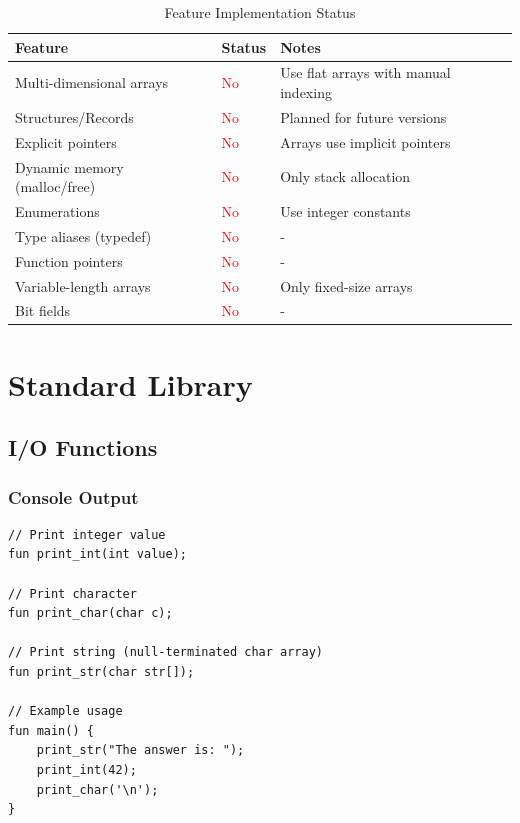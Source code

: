 \documentclass[12pt,a4paper,oneside]{book}
\begin{document}
\begin{table}[H]
\centering
\caption{Feature Implementation Status}
\begin{tabularx}{\textwidth}{|X|l|X|}
\hline
\textbf{Feature} & \textbf{Status} & \textbf{Notes} \\
\hline
Multi-dimensional arrays & \textcolor{red}{No} & Use flat arrays with manual indexing \\
\hline
Structures/Records & \textcolor{red}{No} & Planned for future versions \\
\hline
Explicit pointers & \textcolor{red}{No} & Arrays use implicit pointers \\
\hline
Dynamic memory (malloc/free) & \textcolor{red}{No} & Only stack allocation \\
\hline
Enumerations & \textcolor{red}{No} & Use integer constants \\
\hline
Type aliases (typedef) & \textcolor{red}{No} & - \\
\hline
Function pointers & \textcolor{red}{No} & - \\
\hline
Variable-length arrays & \textcolor{red}{No} & Only fixed-size arrays \\
\hline
Bit fields & \textcolor{red}{No} & - \\
\hline
\end{tabularx}
\end{table}

\chapter{Standard Library}

\section{I/O Functions}

\subsection{Console Output}

\begin{lstlisting}[style=algo, caption={Standard Output Functions}]
// Print integer value
fun print_int(int value);

// Print character
fun print_char(char c);

// Print string (null-terminated char array)
fun print_str(char str[]);

// Example usage
fun main() {
    print_str("The answer is: ");
    print_int(42);
    print_char('\n');
}
\end{lstlisting}
\end{document}
